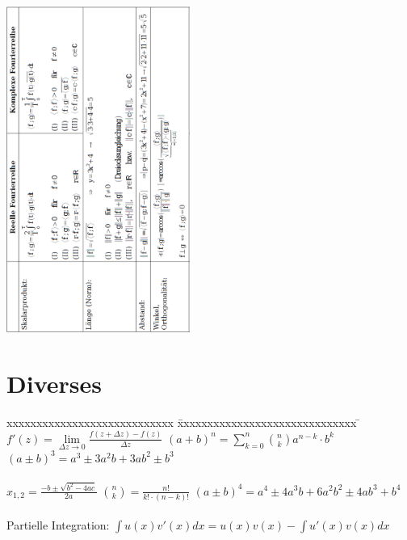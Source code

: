 \begin{minipage}{6cm}
	\includegraphics[width=6cm]{./bilder/vektor1.png}
\end{minipage}

\section{Diverses}
\begin{tabbing}
	xxxxxxxxxxxxxxxxxxxxxxxxxxxx \= xxxxxxxxxxxxxxxxxxxxxxxxxxxxxx \= \kill
 	$f'(z) = \lim \limits_{\Delta z \rightarrow 0} \frac{f(z + \Delta z) -
	f(z)}{\Delta z}$ \> $(a + b)^n = \sum_{k=0}^{n} \binom n k a^{n-k} \cdot b^k$ \>
	$(a \pm b)^3 =a^3 \pm  3 a^{2} b + 3 a b^2 \pm b^3 $\\ \\
	$x_{1,2} = \frac{-b \pm \sqrt{b^2 - 4ac}}{2a}$ \> $\binom n k = \frac{n!}{k!
	\cdot (n-k)!}$ \> $(a \pm b)^4 =a^4 \pm  4 a^{3} b + 6a^2b^2 \pm 4 a b^3 +
	b^4$\\ 
	\\Partielle Integration: $\int u(x) v'(x) dx = u(x)v(x) - \int u'(x) v(x) dx$
\end{tabbing}





